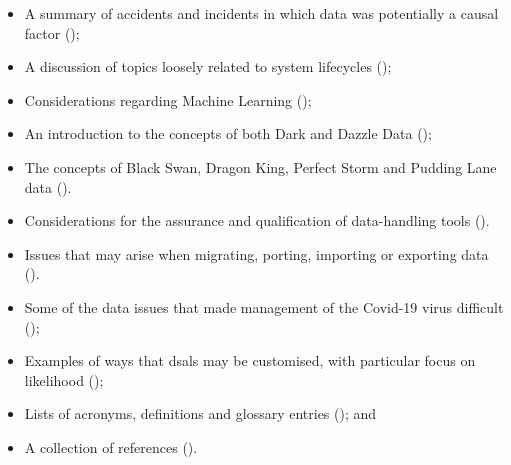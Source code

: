 \begin{itemize}
\begin{itemize}
      \item A summary of accidents and incidents in which data was potentially a causal factor ();
      \item A discussion of topics loosely related to system lifecycles ();
      \item Considerations regarding Machine Learning ();
      \item An introduction to the concepts of both Dark and Dazzle Data ();
      \item The concepts of Black Swan, Dragon King, Perfect Storm and Pudding Lane data ().
      \item Considerations for the assurance and qualification of data-handling tools ().
      \item Issues that may arise when migrating, porting, importing or exporting data ().            
      \item Some of the data issues that made management of the Covid-19 virus difficult ();
      \item Examples of ways that \glspl{dsal} may be customised, with particular focus on likelihood ();
      \item Lists of acronyms, definitions and glossary entries (); and
      \item A collection of references ().
    \end{itemize}
\end{itemize}

%
%
\makeatletter		%
\dsiwg@intblankpage
\makeatother
\setcounter{tocdepth}{2}
\tableofcontents

%
%
\listoftables
%
\listoffigures
\cleardoublepage%
